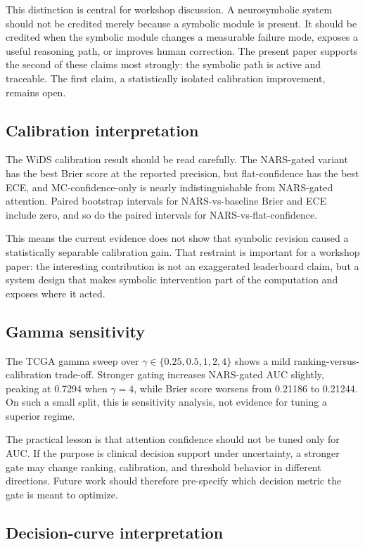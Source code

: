 \documentclass{article}
\begin{document}
This distinction is central for workshop discussion. A neurosymbolic system should not be credited merely because a symbolic module is present. It should be credited when the symbolic module changes a measurable failure mode, exposes a useful reasoning path, or improves human correction. The present paper supports the second of these claims most strongly: the symbolic path is active and traceable. The first claim, a statistically isolated calibration improvement, remains open.

\subsection{Calibration interpretation}

The WiDS calibration result should be read carefully. The NARS-gated variant has the best Brier score at the reported precision, but flat-confidence has the best ECE, and MC-confidence-only is nearly indistinguishable from NARS-gated attention. Paired bootstrap intervals for NARS-vs-baseline Brier and ECE include zero, and so do the paired intervals for NARS-vs-flat-confidence.

This means the current evidence does not show that symbolic revision caused a statistically separable calibration gain. That restraint is important for a workshop paper: the interesting contribution is not an exaggerated leaderboard claim, but a system design that makes symbolic intervention part of the computation and exposes where it acted.

\subsection{Gamma sensitivity}

The TCGA gamma sweep over $\gamma\in\{0.25,0.5,1,2,4\}$ shows a mild ranking-versus-calibration trade-off. Stronger gating increases NARS-gated AUC slightly, peaking at 0.7294 when $\gamma=4$, while Brier score worsens from 0.21186 to 0.21244. On such a small split, this is sensitivity analysis, not evidence for tuning a superior regime.

The practical lesson is that attention confidence should not be tuned only for AUC. If the purpose is clinical decision support under uncertainty, a stronger gate may change ranking, calibration, and threshold behavior in different directions. Future work should therefore pre-specify which decision metric the gate is meant to optimize.

\subsection{Decision-curve interpretation}
\end{document}
